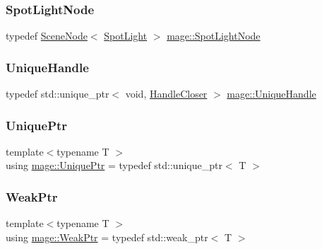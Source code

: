 \hypertarget{namespacemage_ab9f49a82dd438032bb38c5436a657335}{}\label{namespacemage_ab9f49a82dd438032bb38c5436a657335} 
\subsubsection{\texorpdfstring{Spot\+Light\+Node}{SpotLightNode}}
{\footnotesize\ttfamily typedef \hyperlink{classmage_1_1_scene_node}{Scene\+Node}$<$ \hyperlink{classmage_1_1_spot_light}{Spot\+Light} $>$ \hyperlink{namespacemage_ab9f49a82dd438032bb38c5436a657335}{mage\+::\+Spot\+Light\+Node}}

\hypertarget{namespacemage_a284e84e551a05d4fc6c957985b2de3ed}{}\label{namespacemage_a284e84e551a05d4fc6c957985b2de3ed} 
\subsubsection{\texorpdfstring{Unique\+Handle}{UniqueHandle}}
{\footnotesize\ttfamily typedef std\+::unique\+\_\+ptr$<$ void, \hyperlink{structmage_1_1_handle_closer}{Handle\+Closer} $>$ \hyperlink{namespacemage_a284e84e551a05d4fc6c957985b2de3ed}{mage\+::\+Unique\+Handle}}

\hypertarget{namespacemage_a8c307fbcc33bce9b7f2aa4c26c3b95cf}{}\label{namespacemage_a8c307fbcc33bce9b7f2aa4c26c3b95cf} 
\subsubsection{\texorpdfstring{Unique\+Ptr}{UniquePtr}}
{\footnotesize\ttfamily template$<$typename T $>$ \\
using \hyperlink{namespacemage_a8c307fbcc33bce9b7f2aa4c26c3b95cf}{mage\+::\+Unique\+Ptr} = typedef std\+::unique\+\_\+ptr$<$ T $>$}

\hypertarget{namespacemage_aa159a63c0d58464bdf32dfe419dd5dc1}{}\label{namespacemage_aa159a63c0d58464bdf32dfe419dd5dc1} 
\subsubsection{\texorpdfstring{Weak\+Ptr}{WeakPtr}}
{\footnotesize\ttfamily template$<$typename T $>$ \\
using \hyperlink{namespacemage_aa159a63c0d58464bdf32dfe419dd5dc1}{mage\+::\+Weak\+Ptr} = typedef std\+::weak\+\_\+ptr$<$ T $>$}



